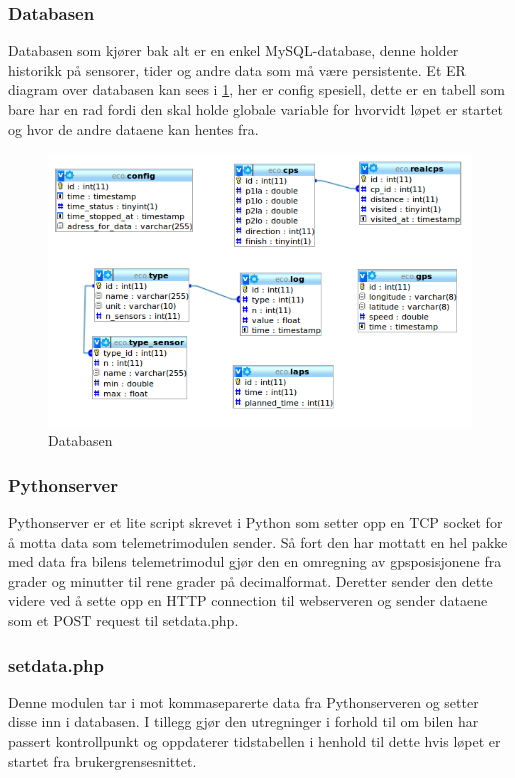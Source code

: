 \subsubsection{Databasen}
Databasen som kjører bak alt er en enkel MySQL-database, denne holder historikk på sensorer, tider og andre data som må være persistente. Et ER diagram over databasen kan sees i \ref{er}, her er config spesiell, dette er en tabell som bare har en rad fordi den skal holde globale variable for hvorvidt løpet er startet og hvor de andre dataene kan hentes fra.
\begin{figure}[H]
\caption{Databasen} 
\label{er}
\includegraphics[width=\textwidth]{images/er.png}
\end{figure}

\subsubsection{Pythonserver}
Pythonserver er et lite script skrevet i Python som setter opp en TCP socket for å motta data som telemetrimodulen sender. Så fort den har mottatt en hel pakke med data fra bilens telemetrimodul gjør den en omregning av gpsposisjonene fra grader og minutter til rene grader på decimalformat. Deretter sender den dette videre ved å sette opp en HTTP connection til webserveren og sender dataene som et POST request til setdata.php.
\subsubsection{setdata.php}
Denne modulen tar i mot kommaseparerte data fra Pythonserveren og setter disse inn i databasen. I tillegg gjør den utregninger i forhold til om bilen har passert kontrollpunkt og oppdaterer tidstabellen i henhold til dette hvis løpet er startet fra brukergrensesnittet.
